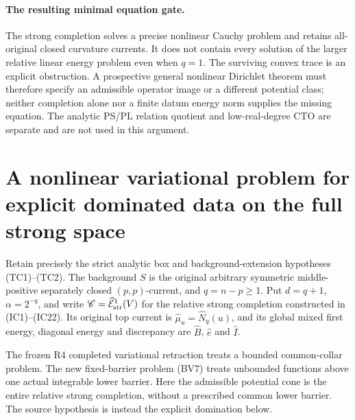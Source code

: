 \documentclass[11pt,a4paper]{article}
\numberwithin{equation}{section}
\theoremstyle{definition}
\theoremstyle{remark}
\begin{document}
\paragraph{The resulting minimal equation gate.}
The strong completion solves a precise nonlinear Cauchy problem
and retains all-original closed curvature currents.  It does
not contain every solution of the larger relative linear
energy problem even when $q=1$.  The surviving convex trace
is an explicit obstruction.  A prospective general nonlinear
Dirichlet theorem must therefore specify an admissible operator
image or a different potential class; neither completion alone
nor a finite datum energy norm supplies the missing equation.
The analytic PS/PL relation quotient and low-real-degree CTO
are separate and are not used in this argument.



\section{A nonlinear variational problem for explicit dominated data on the full strong space}
\label{sec:r11-strong-space-dominated-variational}

Retain precisely the strict analytic box and background-extension
hypotheses (TC1)--(TC2).  The background $S$ is the original
arbitrary symmetric middle-positive separately closed $(p,p)$-current,
and $q=n-p\geq1$.  Put $d=q+1$, $\alpha=2^{-q}$, and write
$\mathscr C=\widehat{\mathcal E}^{1}_{\rm str}(V)$ for the
relative strong completion constructed in (IC1)--(IC22).
Its original top current is $\widehat\mu_u=\widehat N_q(u)$,
and its global mixed first energy, diagonal energy and discrepancy
are $\widehat B$, $\widehat e$ and $\widehat I$.

The frozen R4 completed variational retraction treats a bounded
common-collar problem.  The new fixed-barrier problem (BV7) treats
unbounded functions above one actual integrable lower barrier.
Here the admissible potential cone is the entire relative strong
completion, without a prescribed common lower barrier.  The
source hypothesis is instead the explicit domination below.
\end{document}
